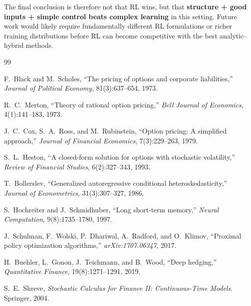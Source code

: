 \documentclass[10pt,a4paper]{article}
\begin{document}
The final conclusion is therefore not that RL wins, but that
\textbf{structure + good inputs + simple control beats complex learning} in
this setting. Future work would likely require fundamentally different RL
formulations or richer training distributions before RL can become competitive
with the best analytic--hybrid methods.

{\footnotesize
\begin{thebibliography}{99}

F.~Black and M.~Scholes,
``The pricing of options and corporate liabilities,''
\textit{Journal of Political Economy}, 81(3):637--654, 1973.

R.~C.~Merton,
``Theory of rational option pricing,''
\textit{Bell Journal of Economics}, 4(1):141--183, 1973.

J.~C.~Cox, S.~A.~Ross, and M.~Rubinstein,
``Option pricing: A simplified approach,''
\textit{Journal of Financial Economics}, 7(3):229--263, 1979.

S.~L.~Heston,
``A closed-form solution for options with stochastic volatility,''
\textit{Review of Financial Studies}, 6(2):327--343, 1993.

T.~Bollerslev,
``Generalized autoregressive conditional heteroskedasticity,''
\textit{Journal of Econometrics}, 31(3):307--327, 1986.

S.~Hochreiter and J.~Schmidhuber,
``Long short-term memory,''
\textit{Neural Computation}, 9(8):1735--1780, 1997.

J.~Schulman, F.~Wolski, P.~Dhariwal, A.~Radford, and O.~Klimov,
``Proximal policy optimization algorithms,''
\textit{arXiv:1707.06347}, 2017.

H.~Buehler, L.~Gonon, J.~Teichmann, and B.~Wood,
``Deep hedging,''
\textit{Quantitative Finance}, 19(8):1271--1291, 2019.

S.~E.~Shreve,
\textit{Stochastic Calculus for Finance II: Continuous-Time Models}.
Springer, 2004.

\end{thebibliography}
}
\end{document}
